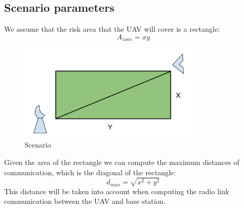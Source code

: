 \subsection*{Scenario parameters}
We assume that the risk area that the UAV will cover is a rectangle:
\begin{equation*}\label{eq:scenario_parameters1} 
 		A_{zone} = xy
\end{equation*}
\begin{figure}[hb]
  	\centering
 	\includegraphics[width=0.8\textwidth]{figures/pic1.png}
  	\caption[Pipeline survey]{Scenario}
\end{figure}
Given the area of the rectangle we can compute the maximum distances of communication, which is the diagonal of the rectangle: 
\begin{equation*}\label{eq:scenario_parameters2} 
 		d_{max} = \sqrt{x^2 + y^2}
\end{equation*}
This distance will be taken into account when computing the radio link communication between the UAV and base station.